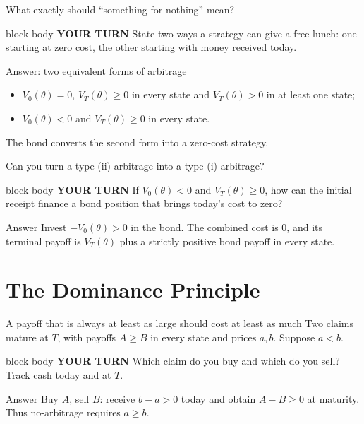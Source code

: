\documentclass[handout,10pt,aspectratio=169]{beamer}
\newenvironment{pausebox}{\begin{beamercolorbox}[rounded=true,sep=0.8em,wd=\textwidth]{block body}
  \textbf{\color{CourseGold}YOUR TURN}\quad}{\end{beamercolorbox}}
\newcommand{\1}{\mathbf 1}
\begin{document}
\begin{frame}{What exactly should ``something for nothing'' mean?}
\begin{pausebox}
State two ways a strategy can give a free lunch: one starting at zero cost,
the other starting with money received today.
\end{pausebox}

\begin{block}{Answer: two equivalent forms of arbitrage}
\begin{itemize}
  \item \(V_0(\theta)=0\), \(V_T(\theta)\geq0\) in every state and
        \(V_T(\theta)>0\) in at least one state;
  \item \(V_0(\theta)<0\) and \(V_T(\theta)\geq0\) in every state.
\end{itemize}
\end{block}
The bond converts the second form into a zero-cost strategy.
\end{frame}



\begin{frame}{Can you turn a type-(ii) arbitrage into a type-(i) arbitrage?}
\begin{pausebox}
If \(V_0(\theta)<0\) and \(V_T(\theta)\geq0\), how can the initial receipt
finance a bond position that brings today's cost to zero?
\end{pausebox}

\begin{exampleblock}{Answer}
Invest \(-V_0(\theta)>0\) in the bond. The combined cost is \(0\), and its
terminal payoff is \(V_T(\theta)\) plus a strictly positive bond payoff in
every state.
\end{exampleblock}
\end{frame}



\section{The Dominance Principle}

\begin{frame}{A payoff that is always at least as large should cost at least as much}
Two claims mature at \(T\), with payoffs \(A\geq B\) in every state and
prices \(a,b\). Suppose \(a<b\).
\begin{pausebox}
Which claim do you buy and which do you sell? Track cash today and at \(T\).
\end{pausebox}

\begin{exampleblock}{Answer}
Buy \(A\), sell \(B\): receive \(b-a>0\) today and obtain
\(A-B\geq0\) at maturity. Thus no-arbitrage requires \(\boxed{a\geq b}\).
\end{exampleblock}
\end{frame}
\end{document}
